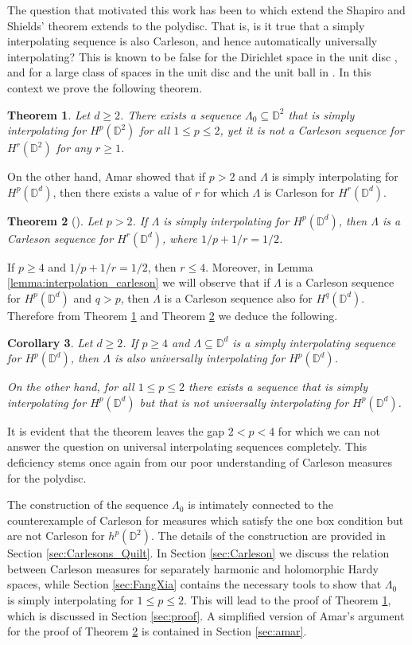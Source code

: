 \documentclass{amsart}
\numberwithin{equation}{section}
\newtheorem{thm}{Theorem}[section]
\newtheorem{coro}[thm]{Corollary}
\newcommand{\D}{\mathbb{D}}
\newcommand{\Hpd}{H^p\left(\mathbb{D}^d\right)}
\begin{document}
	The question that motivated this work has been to which extend the Shapiro and Shields' theorem extends to the polydisc. That is, is it true that a simply interpolating sequence is also Carleson, and hence automatically universally interpolating? This is known to be false for the Dirichlet space in the unit disc \cite{Marshall1994}, 
	and for a large class of spaces in the unit disc and the unit ball in \cite{Chalmoukis24}. In this context we prove the following theorem.
\begin{thm}
    \label{thm:main}
    Let $d\ge2$.
     There exists a sequence $\Lambda_0 \subseteq \D^2$ that is simply interpolating for $H^p(\D^2)$ for all $1\le p\le2$, yet it is not a Carleson sequence for $H^r(\D^2)$ for any $r\ge1$.
\end{thm}
On the other hand, Amar showed  that if $p>2$ and $\Lambda$ is simply interpolating for $H^p(\D^d)$, then there exists a value of $r$ for which $\Lambda$ is Carleson for $H^r(\D^d)$.

\begin{thm}[\cite{Amar2020}]
\label{thm:Amar}
     Let $p>2$. If $\Lambda$ is simply interpolating for $H^p(\D^d)$, then $\Lambda$ is a Carleson sequence for $H^r(\D^d)$, where $1/p+1/r=1/2$.
\end{thm}
If $p\geq 4$ and $1/p+1/r=1/2$, then $r\le4$. Moreover, in Lemma \ref{lemma:interpolation_carleson} we will observe that if $\Lambda$ is a Carleson sequence for $H^p(\D^d)$ and $q>p$, then $\Lambda$ is a Carleson sequence also for $H^q(\D^d)$. Therefore from Theorem \ref{thm:main} and Theorem \ref{thm:Amar} we deduce the following.
\begin{coro}
Let $d\ge2$. If $p\geq 4$ and $\Lambda \subseteq \mathbb{D}^d$ is a simply interpolating sequence for $H^p(\mathbb{D}^d)$, then $\Lambda$ is also universally interpolating for $H^p(\mathbb{D}^d)$.

On the other hand, for all $1\leq p\le2$ there exists a sequence that is simply interpolating for $\Hpd$  but that is not universally interpolating for $H^p(\D^d)$.  
\end{coro}
It is evident that the theorem leaves the gap $2<p<4$ for which we can not answer the question on universal interpolating sequences completely. This deficiency stems once again from our poor understanding of Carleson measures for the polydisc. 


The construction of the sequence $\Lambda_0$ is intimately connected to the counterexample of Carleson for measures which satisfy the one box condition but are not Carleson for $h^p(\mathbb{D}^2).$ The details of the construction are provided in Section \ref{sec:Carlesons_Quilt}. In Section \ref{sec:Carleson} we discuss the relation between Carleson measures for separately harmonic and holomorphic Hardy spaces, while Section \ref{sec:FangXia} contains the necessary tools to show that $\Lambda_0$ is simply interpolating for $1\le p\le2$. This will lead to the proof of Theorem \ref{thm:main}, which is discussed in Section \ref{sec:proof}. A simplified version of Amar's argument for the proof of Theorem \ref{thm:Amar} is contained in Section \ref{sec:amar}.
\end{document}
